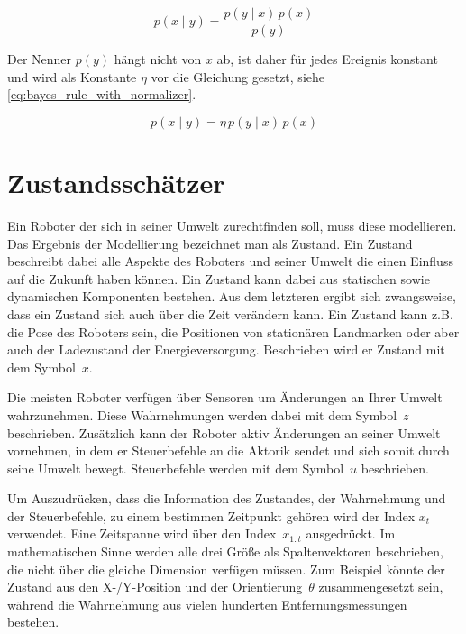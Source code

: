 \begin{equation}
p(x \mid y) = \frac{p(y \mid x) \, p(x)}{p(y)} \label{eq:bayes_rule}
\end{equation}

Der Nenner $p(y)$ hängt nicht von $x$ ab, ist daher für jedes Ereignis konstant und wird als Konstante $\eta$ vor die Gleichung gesetzt, siehe \autoref{eq:bayes_rule_with_normalizer}.

\begin{equation}
p(x \mid y) = \eta \, p(y \mid x) \, p(x) \label{eq:bayes_rule_with_normalizer}
\end{equation}


%
%
%
\section{Zustandsschätzer}
\label{sec:state_estimator}

Ein Roboter der sich in seiner Umwelt zurechtfinden soll, muss diese modellieren. Das Ergebnis der Modellierung bezeichnet man als Zustand. Ein Zustand beschreibt dabei alle Aspekte des Roboters und seiner Umwelt die einen Einfluss auf die Zukunft haben können. Ein Zustand kann dabei aus statischen sowie dynamischen Komponenten bestehen. Aus dem letzteren ergibt sich zwangsweise, dass ein Zustand sich auch über die Zeit verändern kann. Ein Zustand kann z.B. die Pose des Roboters sein, die Positionen von stationären Landmarken oder aber auch der Ladezustand der Energieversorgung. Beschrieben wird er Zustand mit dem Symbol~$x$.

Die meisten Roboter verfügen über Sensoren um Änderungen an Ihrer Umwelt wahrzunehmen. Diese Wahrnehmungen werden dabei mit dem Symbol~$z$ beschrieben. Zusätzlich kann der Roboter aktiv Änderungen an seiner Umwelt vornehmen, in dem er Steuerbefehle an die Aktorik sendet und sich somit durch seine Umwelt bewegt. Steuerbefehle werden mit dem Symbol~$u$ beschrieben.

Um Auszudrücken, dass die Information des Zustandes, der Wahrnehmung und der Steuerbefehle, zu einem bestimmen Zeitpunkt gehören wird der Index $x_t$ verwendet. Eine Zeitspanne wird über den Index~$x_{1:t}$ ausgedrückt. Im mathematischen Sinne werden alle drei Größe als Spaltenvektoren beschrieben, die nicht über die gleiche Dimension verfügen müssen. Zum Beispiel könnte der Zustand aus den X-/Y-Position und der Orientierung~$\theta$ zusammengesetzt sein, während die Wahrnehmung aus vielen hunderten Entfernungsmessungen bestehen.

